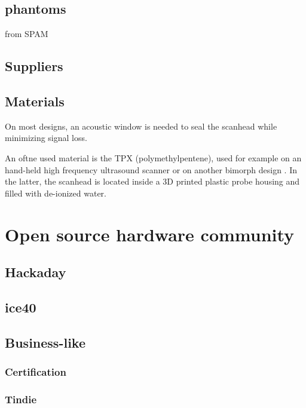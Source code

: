 \documentclass[conference]{IEEEtran}
\begin{document}
\subsection{phantoms}

\cite{nolting_inexpensive_2016} from SPAM

\subsection{Suppliers}


\subsection{Materials}


On most designs, an acoustic window is needed to seal the scanhead while minimizing signal loss.

An oftne used material is the TPX (polymethylpentene), used for example on an hand-held high frequency ultrasound scanner  \cite{erickson_hand-held_2001} or on another bimorph design \cite{brown_low_2013}. In the latter, the scanhead is located inside a 3D printed plastic probe housing and filled with de-ionized water.

\section{Open source hardware community}

\subsection{Hackaday}


\subsection{ice40}



\subsection{Business-like}



\subsubsection{Certification}



\subsubsection{Tindie}
\end{document}
